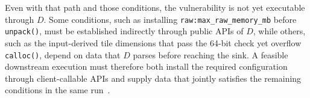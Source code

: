 Even with that path and those conditions, the vulnerability is not yet executable through $D$.
Some conditions, such as installing \texttt{raw:max\_raw\_memory\_mb} before \texttt{unpack()}, must be established indirectly through public APIs of $D$, while others, such as the input-derived tile dimensions that pass the 64-bit check yet overflow \texttt{calloc()}, depend on data that $D$ parses before reaching the sink.
A feasible downstream execution must therefore both install the required configuration through client-callable APIs and supply data that jointly satisfies the remaining conditions in the same run~\cite{cadar2008klee, ma2011directedse, luo2023selectfuzz}.














